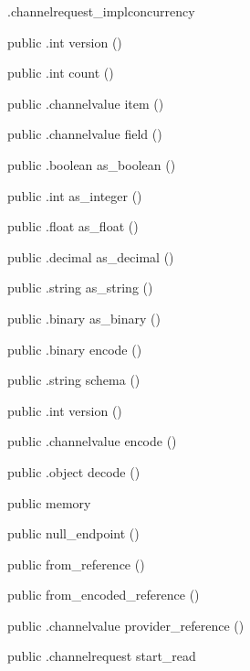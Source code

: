 \begin{CrexxClass}{.channelrequest\_impl}{concurrency}
\begin{Members}
    \Method
      {public}
      {.int}
      {version}
      {()}

    \Method
      {public}
      {.int}
      {count}
      {()}

    \Method
      {public}
      {.channelvalue}
      {item}
      {()}

    \Method
      {public}
      {.channelvalue}
      {field}
      {()}

    \Method
      {public}
      {.boolean}
      {as\_boolean}
      {()}

    \Method
      {public}
      {.int}
      {as\_integer}
      {()}

    \Method
      {public}
      {.float}
      {as\_float}
      {()}

    \Method
      {public}
      {.decimal}
      {as\_decimal}
      {()}

    \Method
      {public}
      {.string}
      {as\_string}
      {()}

    \Method
      {public}
      {.binary}
      {as\_binary}
      {()}

    \Method
      {public}
      {.binary}
      {encode}
      {()}

    \Method
      {public}
      {.string}
      {schema}
      {()}

    \Method
      {public}
      {.int}
      {version}
      {()}

    \Method
      {public}
      {.channelvalue}
      {encode}
      {()}

    \Method
      {public}
      {.object}
      {decode}
      {()}

    \Factory
      {public}
      {memory}
      {}

    \Factory
      {public}
      {null\_endpoint}
      {()}

    \Factory
      {public}
      {from\_reference}
      {()}

    \Factory
      {public}
      {from\_encoded\_reference}
      {()}

    \Method
      {public}
      {.channelvalue}
      {provider\_reference}
      {()}

    \Method
      {public}
      {.channelrequest}
      {start\_read}
      {}


\end{Members}
\end{CrexxClass}
